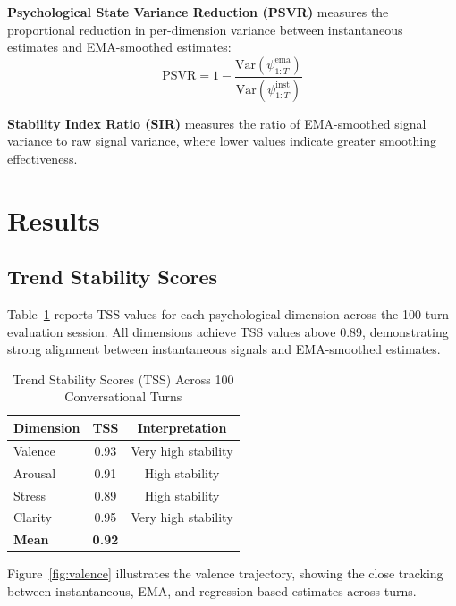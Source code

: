 \documentclass[conference]{IEEEtran}
\begin{document}
\textbf{Psychological State Variance Reduction (PSVR)} measures the proportional reduction in per-dimension variance between instantaneous estimates and EMA-smoothed estimates:
\begin{equation}
\text{PSVR} = 1 - \frac{\text{Var}(\psi^{\text{ema}}_{1:T})}{\text{Var}(\psi^{\text{inst}}_{1:T})}
\label{eq:psvr}
\end{equation}

\textbf{Stability Index Ratio (SIR)} measures the ratio of EMA-smoothed signal variance to raw signal variance, where lower values indicate greater smoothing effectiveness.

\section{Results}
\label{sec:results}

\subsection{Trend Stability Scores}

Table~\ref{tab:tss} reports TSS values for each psychological dimension across the 100-turn evaluation session. All dimensions achieve TSS values above 0.89, demonstrating strong alignment between instantaneous signals and EMA-smoothed estimates.

\begin{table}[htbp]
\centering
\caption{Trend Stability Scores (TSS) Across 100 Conversational Turns}
\label{tab:tss}
\begin{tabular}{lcc}
\toprule
\textbf{Dimension} & \textbf{TSS} & \textbf{Interpretation} \\
\midrule
Valence   & 0.93 & Very high stability \\
Arousal   & 0.91 & High stability \\
Stress    & 0.89 & High stability \\
Clarity   & 0.95 & Very high stability \\
\midrule
\textbf{Mean} & \textbf{0.92} & \\
\bottomrule
\end{tabular}
\end{table}

Figure~\ref{fig:valence} illustrates the valence trajectory, showing the close tracking between instantaneous, EMA, and regression-based estimates across turns.
\end{document}

